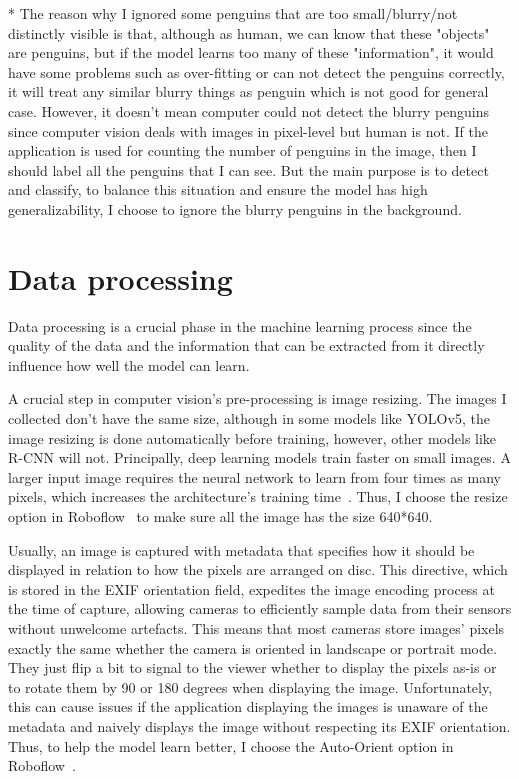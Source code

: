\documentclass[runningheads]{llncs}
\begin{document}
* The reason why I ignored some penguins that are too small/blurry/not distinctly visible is that, although as human, we can know that these "objects" are penguins, but if the model learns too many of these "information", it would have some problems such as over-fitting or can not detect the penguins correctly, it will treat any similar blurry things as penguin which is not good for general case. However, it doesn't mean computer could not detect the blurry penguins since computer vision deals with images in pixel-level but human is not. If the application is used for counting the number of penguins in the image, then I should label all the penguins that I can see. But the main purpose is to detect and classify, to balance this situation and ensure the model has high generalizability, I choose to ignore the blurry penguins in the background.

\section{Data processing}
Data processing is a crucial phase in the machine learning process since the quality of the data and the information that can be extracted from it directly influence how well the model can learn. 

A crucial step in computer vision's pre-processing is image resizing. The images I collected don't have the same size, although in some models like YOLOv5, the image resizing is done automatically before training, however, other models like R-CNN will not. Principally, deep learning models train faster on small images. A larger input image requires the neural network to learn from four times as many pixels, which increases the architecture's training time~\cite{resize}. Thus, I choose the resize option in Roboflow~\cite{ref_roboflow} to make sure all the image has the size 640*640.

Usually, an image is captured with metadata that specifies how it should be displayed in relation to how the pixels are arranged on disc. This directive, which is stored in the EXIF orientation field, expedites the image encoding process at the time of capture, allowing cameras to efficiently sample data from their sensors without unwelcome artefacts. This means that most cameras store images' pixels exactly the same whether the camera is oriented in landscape or portrait mode. They just flip a bit to signal to the viewer whether to display the pixels as-is or to rotate them by 90 or 180 degrees when displaying the image. Unfortunately, this can cause issues if the application displaying the images is unaware of the metadata and naively displays the image without respecting its EXIF orientation. Thus, to help the model learn better, I choose the Auto-Orient option in Roboflow~\cite{ref_roboflow}.
\end{document}

